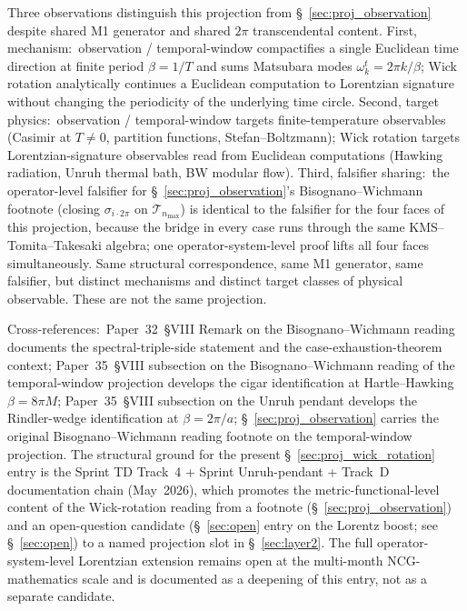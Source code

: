 Three observations distinguish this projection from
\S~\ref{sec:proj_observation} despite shared M1 generator and
shared $2\pi$ transcendental content.
First, mechanism:\ observation / temporal-window compactifies a
single Euclidean time direction at finite period $\beta = 1/T$ and
sums Matsubara modes $\omega_k^t = 2\pi k / \beta$; Wick rotation
analytically continues a Euclidean computation to Lorentzian
signature without changing the periodicity of the underlying time
circle.
Second, target physics:\ observation / temporal-window targets
finite-temperature observables (Casimir at $T \neq 0$, partition
functions, Stefan--Boltzmann); Wick rotation targets
Lorentzian-signature observables read from Euclidean computations
(Hawking radiation, Unruh thermal bath, BW modular flow).
Third, falsifier sharing:\ the operator-level falsifier for
\S~\ref{sec:proj_observation}'s Bisognano--Wichmann footnote
(closing $\sigma_{i\cdot 2\pi}$ on $\mathcal{T}_{n_{\max}}$) is
identical to the falsifier for the four faces of this projection,
because the bridge in every case runs through the same
KMS--Tomita--Takesaki algebra; one operator-system-level proof
lifts all four faces simultaneously.  Same structural correspondence,
same M1 generator, same falsifier, but distinct mechanisms and
distinct target classes of physical observable.  These are not the
same projection.

Cross-references:\ Paper~32~§VIII Remark on the Bisognano--Wichmann
reading documents the spectral-triple-side statement and the
case-exhaustion-theorem context; Paper~35~§VIII subsection on the
Bisognano--Wichmann reading of the temporal-window projection
develops the cigar identification at Hartle--Hawking
$\beta = 8\pi M$; Paper~35~§VIII subsection on the Unruh pendant
develops the Rindler-wedge identification at $\beta = 2\pi / a$;
\S~\ref{sec:proj_observation} carries the original
Bisognano--Wichmann reading footnote on the temporal-window
projection.  The structural ground for the present \S~\ref{sec:proj_wick_rotation}
entry is the Sprint TD Track~4 + Sprint Unruh-pendant + Track~D
documentation chain (May~2026), which promotes the metric-functional-level
content of the Wick-rotation reading from a footnote (\S~\ref{sec:proj_observation})
and an open-question candidate (\S~\ref{sec:open} entry
on the Lorentz boost; see \S~\ref{sec:open}) to a named projection
slot in \S~\ref{sec:layer2}.  The full operator-system-level
Lorentzian extension remains open at the multi-month NCG-mathematics
scale and is documented as a deepening of this entry, not as a
separate candidate.
